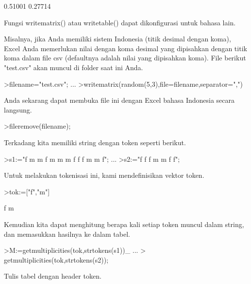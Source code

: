 \documentclass{article}
\begin{document}
\begin{eulernotebook}
\begin{eulercomment}
\begin{eulercomment}
\begin{eulercomment}
\begin{eulercomment}
\begin{eulercomment}
\begin{eulercomment}
\begin{eulercomment}
\begin{eulercomment}
\begin{eulercomment}
\begin{eulercomment}
\begin{eulercomment}
\begin{eulercomment}
\begin{eulercomment}
\begin{eulercomment}
\begin{euleroutput}
  0.51001
  0.27714
\end{euleroutput}
\begin{eulercomment}
Fungsi writematrix() atau writetable() dapat dikonfigurasi untuk
bahasa lain.

Misalnya, jika Anda memiliki sistem Indonesia (titik desimal dengan
koma), Excel Anda memerlukan nilai dengan koma desimal yang dipisahkan
dengan titik koma dalam file csv (defaultnya adalah nilai yang
dipisahkan koma). File berikut "test.csv" akan muncul di folder saat
ini Anda.
\end{eulercomment}
\begin{eulerprompt}
>filename="test.csv"; ...
>writematrix(random(5,3),file=filename,separator=",")
\end{eulerprompt}
\begin{eulercomment}
Anda sekarang dapat membuka file ini dengan Excel bahasa Indonesia
secara langsung.
\end{eulercomment}
\begin{eulerprompt}
>fileremove(filename);
\end{eulerprompt}
\begin{eulercomment}
Terkadang kita memiliki string dengan token seperti berikut.
\end{eulercomment}
\begin{eulerprompt}
>s1:="f m m f m m m f f f m m f";  ...
>s2:="f f f m m f f";
\end{eulerprompt}
\begin{eulercomment}
Untuk melakukan tokenisasi ini, kami mendefinisikan vektor token.
\end{eulercomment}
\begin{eulerprompt}
>tok:=["f","m"]
\end{eulerprompt}
\begin{euleroutput}
  f
  m
\end{euleroutput}
\begin{eulercomment}
Kemudian kita dapat menghitung berapa kali setiap token muncul dalam
string, dan memasukkan hasilnya ke dalam tabel.
\end{eulercomment}
\begin{eulerprompt}
>M:=getmultiplicities(tok,strtokens(s1))_ ...
>  getmultiplicities(tok,strtokens(s2));
\end{eulerprompt}
\begin{eulercomment}
Tulis tabel dengan header token.
\end{eulercomment}
\begin{eulerprompt}

\end{eulerprompt}
\end{eulercomment}
\end{eulercomment}
\end{eulercomment}
\end{eulercomment}
\end{eulercomment}
\end{eulercomment}
\end{eulercomment}
\end{eulercomment}
\end{eulercomment}
\end{eulercomment}
\end{eulercomment}
\end{eulercomment}
\end{eulercomment}
\end{eulercomment}
\end{eulernotebook}
\end{document}

